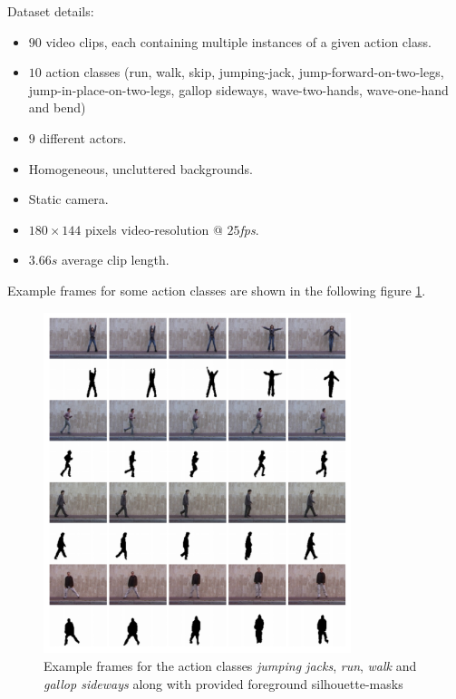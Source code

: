 Dataset details: \cite{kang_review_2016}
\begin{itemize}
    \item $90$ video clips, each containing multiple instances of a given action class.
    \item $10$ action classes (run, walk, skip, jumping-jack, jump-forward-on-two-legs, jump-in-place-on-two-legs, gallop sideways, wave-two-hands, wave-one-hand and bend) 
    \item $9$ different actors.
    \item Homogeneous, uncluttered backgrounds.
    \item Static camera.
    \item $180 \times 144$ pixels video-resolution @ $25$\textit{fps}.
    \item $3.66s$ average clip length.
\end{itemize}

Example frames for some action classes are shown in the following figure \ref{fig:weizmann_example}.

\begin{figure}[H]
    \centering
    \includegraphics[width=0.8\textwidth]{img_datasets/weizmann_example}
    \caption{Example frames for the action classes \textit{jumping jacks}, \textit{run}, \textit{walk} and \textit{gallop sideways} along with provided foreground silhouette-masks \cite{blank_actions_2005}}
    \label{fig:weizmann_example}
\end{figure}


